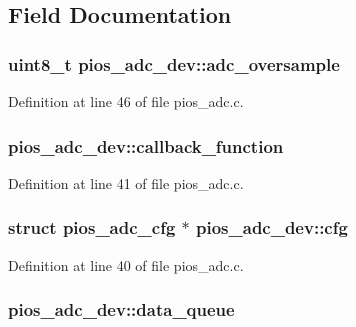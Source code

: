 \subsection{Field Documentation}
\hypertarget{structpios__adc__dev_a04b14773a967d8f2c13d8a9ceccc0560}{
\subsubsection[{adc\-\_\-oversample}]{ {\bf uint8\-\_\-t} pios\-\_\-adc\-\_\-dev\-::adc\-\_\-oversample}}\label{structpios__adc__dev_a04b14773a967d8f2c13d8a9ceccc0560}


Definition at line 46 of file pios\-\_\-adc.\-c.

\hypertarget{structpios__adc__dev_a31e4682df8d269ef7b259a87dca032e1}{
\subsubsection[{callback\-\_\-function}]{ pios\-\_\-adc\-\_\-dev\-::callback\-\_\-function}}\label{structpios__adc__dev_a31e4682df8d269ef7b259a87dca032e1}


Definition at line 41 of file pios\-\_\-adc.\-c.

\hypertarget{structpios__adc__dev_a46b6ae48c424fd83068b3e1cee0e1e2e}{
\subsubsection[{cfg}]{\setlength{\rightskip}{0pt plus 5cm}struct {\bf pios\-\_\-adc\-\_\-cfg} $\ast$ pios\-\_\-adc\-\_\-dev\-::cfg}}\label{structpios__adc__dev_a46b6ae48c424fd83068b3e1cee0e1e2e}


Definition at line 40 of file pios\-\_\-adc.\-c.

\hypertarget{structpios__adc__dev_a50acc85db871c08a1fa88a54e11df24f}{
\subsubsection[{data\-\_\-queue}]{ pios\-\_\-adc\-\_\-dev\-::data\-\_\-queue}}\label{structpios__adc__dev_a50acc85db871c08a1fa88a54e11df24f}


